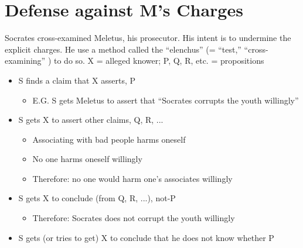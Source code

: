 \documentclass[10 pt]{article}
\begin{document}
\section*{Defense against M's Charges}
Socrates cross-examined Meletus, his prosecutor. His intent is to undermine the explicit charges.  He use a method called the ``elenchus'' (= ``test,'' ``cross-examining'' ) to do so.
\noindent X = alleged knower; P, Q, R, etc. = propositions
\begin{itemize}
\item{S finds a claim that X asserts, P}\begin{itemize}\item{E.G. S gets Meletus to assert that ``Socrates corrupts the youth willingly''}\end{itemize}
\item{S gets X to assert other claims, Q, R, ...}
\begin{itemize}\item{Associating with bad people harms oneself}\item{No one harms oneself willingly}\item{Therefore: no one would harm one's associates willingly}\end{itemize}

\item{S gets X to conclude (from Q, R, ...), not-P}\begin{itemize}\item{Therefore: Socrates does not corrupt the youth willingly}\end{itemize}

\item{S gets (or tries to get) X to conclude that he does not know whether P}
\end{itemize}

\end{document}
